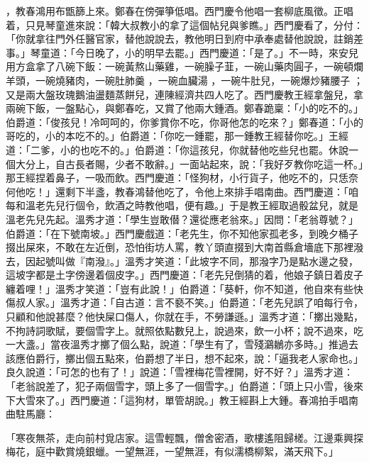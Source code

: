 \begin{showcontents}{}
，教春鴻用布甑篩上來。鄭春在傍彈箏低唱。西門慶令他唱一套柳底風徵。正唱着，只見琴童進來說：「韓大叔教小的拿了這個帖兒與爹瞧。」西門慶看了，分付：「你就拿往門外任醫官家，替他說說去，教他明日到府中承奉處替他說說，註銷差事。」琴童道：「今日晚了，小的明早去罷。」西門慶道：「是了。」不一時，來安兒用方盒拿了八碗下飯：一碗黃熬山藥雞，一碗臊子韮，一碗山藥肉圓子，一碗頓爛羊頭，一碗燒豬肉，一碗肚肺羹 ，一碗血臟湯 ，一碗牛肚兒，一碗爆炒豬腰子 ；又是兩大盤玫瑰鵝油盪麵蒸餅兒，連陳經濟共四人吃了。西門慶教王經拿盤兒，拿兩碗下飯，一盤點心，與鄭春吃，又賞了他兩大鍾酒。鄭春跪稟：「小的吃不的。」伯爵道：「俊孩兒！冷呵呵的，你爹賞你不吃，你哥他怎的吃來？」鄭春道：「小的哥吃的，小的本吃不的。」伯爵道：「你吃一鍾罷，那一鍾教王經替你吃。」王經道：「二爹，小的也吃不的。」伯爵道：「你這孩兒，你就替他吃些兒也罷。休說一個大分上，自古長者賜，少者不敢辭。」一面站起來，說：「我好歹教你吃這一杯。」那王經捏着鼻子，一吸而飲。西門慶道：「怪狗材，小行貨子，他吃不的，只恁奈何他吃！」還剩下半盞，教春鴻替他吃了，令他上來排手唱南曲。西門慶道：「咱每和溫老先兒行個令，飲酒之時教他唱，便有趣。」于是教王經取過骰盆兒，就是溫老先兒先起。溫秀才道：「學生豈敢僣？還從應老翁來。」因問：「老翁尊號？」伯爵道：「在下號南坡。」西門慶戲道：「老先生，你不知他家孤老多，到晚夕桶子掇出屎來，不敢在左近倒，恐怕街坊人罵，教丫頭直掇到大南首縣倉墻底下那裡潑去，因起號叫做『南潑』。」溫秀才笑道：「此坡字不同，那潑字乃是點水邊之發，這坡字都是土字傍邊着個皮字。」西門慶道：「老先兒倒猜的着，他娘子鎮日着皮子纏着哩！」溫秀才笑道：「豈有此說！」伯爵道：「葵軒，你不知道，他自來有些快傷叔人家。」溫秀才道：「自古道：言不褻不笑。」伯爵道：「老先兒誤了咱每行令，只顧和他說甚麼？他快屎口傷人，你就在手，不勞謙遜。」溫秀才道：「擲出幾點，不拘詩詞歌賦，要個雪字上。就照依點數兒上，說過來，飲一小杯；說不過來，吃一大盞。」當夜溫秀才擲了個么點，說道：「學生有了，雪殘鸂鶒亦多時。」推過去該應伯爵行，擲出個五點來，伯爵想了半日，想不起來，說：「逼我老人家命也。」良久說道：「可怎的也有了！」說道：「雪裡梅花雪裡開，好不好？」溫秀才道：「老翁說差了，犯子兩個雪字，頭上多了一個雪字。」伯爵道：「頭上只小雪，後來下大雪來了。」西門慶道：「這狗材，單管胡說。」教王經斟上大鍾。春鴻拍手唱南曲駐馬廳：

「寒夜無茶，走向前村覓店家。這雪輕飄，僧舍密酒，歌樓遙阻歸槎。江邊乘興探梅花，庭中歡賞燒銀蠟。一望無涯，一望無涯，有似濡橋柳絮，滿天飛下。」


\end{showcontents}
